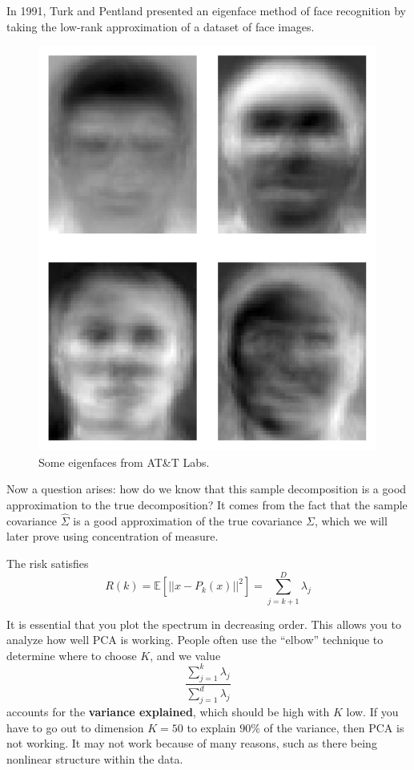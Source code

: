   \begin{example}[Eigenfaces]
    In 1991, Turk and Pentland presented an eigenface method of face recognition by taking the low-rank approximation of a dataset of face images. 

    \begin{figure}[H]
      \centering 
      \includegraphics[scale=0.3]{img/eigenfaces.png}
      \caption{Some eigenfaces from AT\&T Labs. } 
      \label{fig:eigenfaces}
    \end{figure}
  \end{example}

  Now a question arises: how do we know that this sample decomposition is a good approximation to the true decomposition? It comes from the fact that the sample covariance $\hat{\Sigma}$ is a good approximation of the true covariance $\Sigma$, which we will later prove using concentration of measure. 

  \begin{theorem}[Risk]
    The risk satisfies 
    \begin{equation}
      R(k) = \mathbb{E}[|| x - P_k (x) ||^2 ] = \sum_{j=k+1}^D \lambda_j 
    \end{equation}
  \end{theorem}

  It is essential that you plot the spectrum in decreasing order. This allows you to analyze how well PCA is working. People often use the ``elbow'' technique to determine where to choose $K$, and we value 
  \begin{equation}
    \frac{\sum_{j=1}^k \lambda_j}{\sum_{j=1}^d \lambda_j} 
  \end{equation}
  accounts for the \textbf{variance explained}, which should be high with $K$ low. If you have to go out to dimension $K=50$ to explain $90\%$ of the variance, then PCA is not working. It may not work because of many reasons, such as there being nonlinear structure within the data. 

